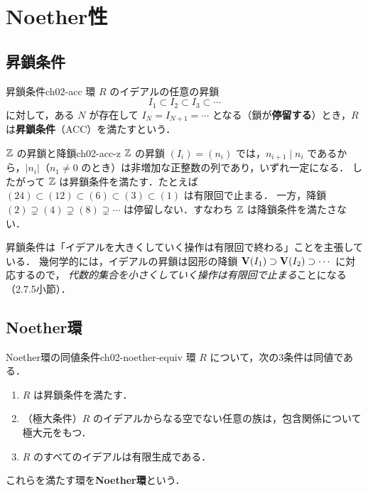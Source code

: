 \section{Noether性}

\subsection{昇鎖条件}

\begin{mydef}{昇鎖条件}{ch02-acc}
環 $R$ のイデアルの任意の昇鎖
\[
  I_1\subset I_2\subset I_3\subset\cdots
\]
に対して，ある $N$ が存在して $I_N=I_{N+1}=\cdots$ となる（鎖が\textbf{停留する}）とき，$R$ は\textbf{昇鎖条件}（ACC）を満たすという．
\end{mydef}

\begin{myex}{$\mathbb{Z}$ の昇鎖と降鎖}{ch02-acc-z}
$\mathbb{Z}$ の昇鎖 $(I_i)=(n_i)$ では，$n_{i+1}\mid n_i$ であるから，$|n_i|$（$n_1\ne0$ のとき）は非増加な正整数の列であり，いずれ一定になる．
したがって $\mathbb{Z}$ は昇鎖条件を満たす．たとえば $(24)\subset(12)\subset(6)\subset(3)\subset(1)$ は有限回で止まる．
一方，降鎖 $(2)\supsetneq(4)\supsetneq(8)\supsetneq\cdots$ は停留しない．すなわち $\mathbb{Z}$ は降鎖条件を満たさない．
\end{myex}

昇鎖条件は「イデアルを大きくしていく操作は有限回で終わる」ことを主張している．
幾何学的には，イデアルの昇鎖は図形の降鎖 $\mathbf{V}(I_1)\supset\mathbf{V}(I_2)\supset\cdots$ に対応するので，
\emph{代数的集合を小さくしていく操作は有限回で止まる}ことになる（2.7.5小節）．

\subsection{Noether環}

\begin{mythm}{Noether環の同値条件}{ch02-noether-equiv}
環 $R$ について，次の3条件は同値である．
\begin{enumerate}
  \item $R$ は昇鎖条件を満たす．
  \item （極大条件）$R$ のイデアルからなる空でない任意の族は，包含関係について極大元をもつ．
  \item $R$ のすべてのイデアルは有限生成である．
\end{enumerate}
これらを満たす環を\textbf{Noether環}という．
\end{mythm}

